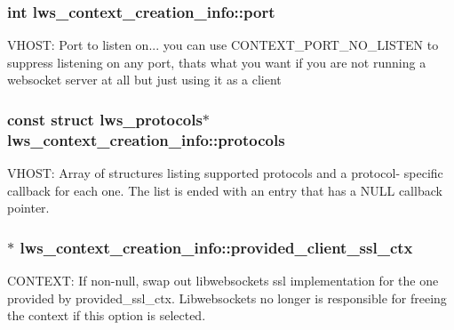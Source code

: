 \subsubsection[{\texorpdfstring{port}{port}}]{\setlength{\rightskip}{0pt plus 5cm}int lws\+\_\+context\+\_\+creation\+\_\+info\+::port}\hypertarget{structlws__context__creation__info_a424a5ce268d6903e42243be94487ab85}{}\label{structlws__context__creation__info_a424a5ce268d6903e42243be94487ab85}
V\+H\+O\+ST\+: Port to listen on... you can use C\+O\+N\+T\+E\+X\+T\+\_\+\+P\+O\+R\+T\+\_\+\+N\+O\+\_\+\+L\+I\+S\+T\+EN to suppress listening on any port, that\textquotesingle{}s what you want if you are not running a websocket server at all but just using it as a client 
\subsubsection[{\texorpdfstring{protocols}{protocols}}]{\setlength{\rightskip}{0pt plus 5cm}const struct {\bf lws\+\_\+protocols}$\ast$ lws\+\_\+context\+\_\+creation\+\_\+info\+::protocols}\hypertarget{structlws__context__creation__info_abb90ffb3e6d6db2db20f529d61bd9122}{}\label{structlws__context__creation__info_abb90ffb3e6d6db2db20f529d61bd9122}
V\+H\+O\+ST\+: Array of structures listing supported protocols and a protocol-\/ specific callback for each one. The list is ended with an entry that has a N\+U\+LL callback pointer. 
\subsubsection[{\texorpdfstring{provided\+\_\+client\+\_\+ssl\+\_\+ctx}{provided\_client\_ssl\_ctx}}]{$\ast$ lws\+\_\+context\+\_\+creation\+\_\+info\+::provided\+\_\+client\+\_\+ssl\+\_\+ctx}\hypertarget{structlws__context__creation__info_a1654d41bea6fb2f619b57e6a264b26a4}{}\label{structlws__context__creation__info_a1654d41bea6fb2f619b57e6a264b26a4}
C\+O\+N\+T\+E\+XT\+: If non-\/null, swap out libwebsockets ssl implementation for the one provided by provided\+\_\+ssl\+\_\+ctx. Libwebsockets no longer is responsible for freeing the context if this option is selected. 
